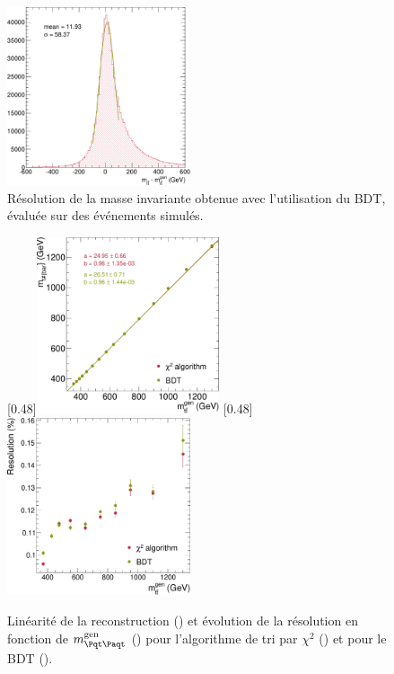 \begin{figure}[tbp]
  \centering
  \includegraphics[width=0.48\textwidth]{chapitre6/figs/mtt_resolution_bdt.pdf}
  \caption{Résolution de la masse invariante \mtt obtenue avec l'utilisation du BDT, évaluée sur des événements \ttbar simulés.}
  \label{fig:mtt_reso_bdt}
\end{figure}
\begin{figure}[tbp] \centering
    \subcaptionbox{\label{fig:mtt_response_chi2_vs_bdt}}[0.48\textwidth]{\includegraphics[width=0.48\textwidth]{chapitre6/figs/mtt_response_vs_gen_comparison_chi2_bdt.pdf}}\hfill
    \subcaptionbox{\label{fig:mtt_reso_vs_mtt_gen_chi2_vs_bdt}}[0.48\textwidth]{\includegraphics[width=0.48\textwidth]{chapitre6/figs/mtt_resolution_vs_gen_comparison_chi2_bdt.pdf}}
    \caption{Linéarité de la reconstruction () et évolution de la résolution en fonction de $\mtt^\text{gen}$ () pour l'algorithme de tri par $\chi^2$ (\rouge) et pour le BDT (\vertc).}
    \label{fig:mtt_reso_chi2_vs_bdt}
\end{figure}


